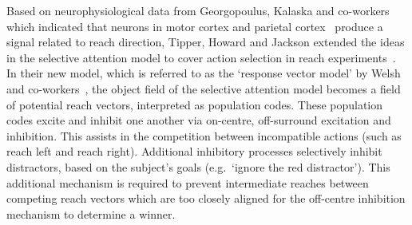 \documentclass[10pt,letterpaper]{article}
\begin{document}
Based on neurophysiological data from Georgopoulus, Kalaska and
co-workers which indicated that neurons in motor
cortex\cite{georgopoulos_neuronal_1986} and parietal
cortex~\cite{kalaska_cortical_1983} produce a signal related to reach
direction, Tipper, Howard and Jackson extended the ideas in the
selective attention model to cover action selection in reach
experiments~\cite{tipper_selective_1997}. In their new model, which is
referred to as the `response vector model' by Welsh and
co-workers~\cite{welsh_movement_2004}, the object field of the
selective attention model becomes a field of potential reach vectors,
interpreted as population codes.  These population codes excite and
inhibit one another via on-centre, off-surround excitation and
inhibition. This assists in the competition between incompatible
actions (such as reach left and reach right). Additional inhibitory
processes selectively inhibit distractors, based on the subject's
goals (e.g.~`ignore the red distractor'). This additional mechanism is
required to prevent intermediate reaches between competing reach
vectors which are too closely aligned for the off-centre inhibition
mechanism to determine a winner.
\end{document}
